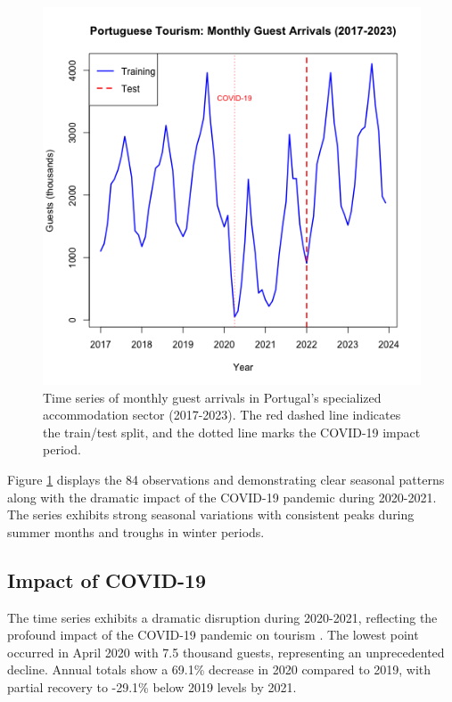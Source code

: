 \documentclass[journal]{IEEEtran}
\begin{document}
\begin{figure}[h]
    \centering
    \includegraphics[width=1\linewidth]{plots/monthly-guest-arrivals.png}
    \caption{Time series of monthly guest arrivals in Portugal's specialized accommodation sector (2017-2023). The red dashed line indicates the train/test split, and the dotted line marks the COVID-19 impact period.}
    \label{fig:timeseries}
\end{figure}

Figure \ref{fig:timeseries} displays the 84 observations  and demonstrating clear seasonal patterns along with the dramatic impact of the COVID-19 pandemic during 2020-2021. The series exhibits strong seasonal variations with consistent peaks during summer months and troughs in winter periods.

\subsection{Impact of COVID-19}

The time series exhibits a dramatic disruption during 2020-2021, reflecting the profound impact of the COVID-19 pandemic on tourism \cite{gössling2020pandemics}. The lowest point occurred in April 2020 with 7.5 thousand guests, representing an unprecedented decline. Annual totals show a 69.1\% decrease in 2020 compared to 2019, with partial recovery to -29.1\% below 2019 levels by 2021.
\end{document}
